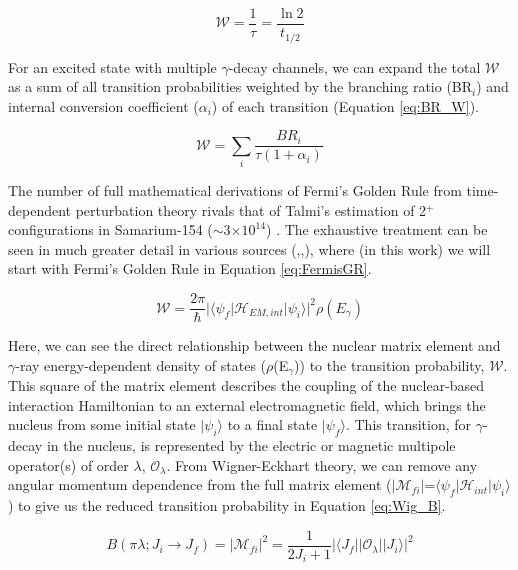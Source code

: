 \begin{equation}\label{eq:life_halflife}
\mathcal{W}=\frac{1}{\tau}=\frac{\ln2}{t_{1/2}}
\end{equation}

For an excited state with multiple $\gamma$-decay channels, we can expand the total $\mathcal{W}$ as a sum of all transition probabilities weighted by the branching ratio (BR$_i$) and internal conversion coefficient ($\alpha_i$) of each transition (Equation \ref{eq:BR_W}).

\begin{equation}\label{eq:BR_W}
\mathcal{W}=\sum_i\frac{BR_i}{\tau(1+\alpha_i)}
\end{equation}

The number of full mathematical derivations of Fermi's Golden Rule from time-dependent perturbation theory rivals that of Talmi's estimation of 2$^+$ configurations in Samarium-154 ($\sim$3$\times10^{14}$) \cite{Casten_text}. The exhaustive treatment can be seen in much greater detail in various sources (\cite{Wong_text},\cite{Heyde_text},\cite{BlattWeiss_text}), where (in this work) we will start with Fermi's Golden Rule \cite{Wong_text} in Equation \ref{eq:FermisGR}.

\begin{equation}\label{eq:FermisGR}
\mathcal{W}=\frac{2\pi}{\hbar}\vert\langle\psi_f\vert \mathcal{H}_{EM,int}\vert\psi_i\rangle\vert^2\rho(E_\gamma)
\end{equation}

Here, we can see the direct relationship between the nuclear matrix element and $\gamma$-ray energy-dependent density of states ($\rho$(E$_\gamma$)) to the transition probability, $\mathcal{W}$. This square of the matrix element describes the coupling of the nuclear-based interaction Hamiltonian to an external electromagnetic field, which brings the nucleus from some initial state $\vert\psi_i\rangle$ to a final state $\vert\psi_f\rangle$. This transition, for $\gamma$-decay in the nucleus, is represented by the electric or magnetic multipole operator(s) of order $\lambda$, $\mathcal{O}_{\lambda}$. From Wigner-Eckhart theory, we can remove any angular momentum dependence from the full matrix element ($\vert\mathcal{M}_{fi}\vert$=$\langle\psi_f\vert \mathcal{H}_{int}\vert\psi_i\rangle$) to give us the reduced transition probability in Equation \ref{eq:Wig_B}.

\begin{equation}\label{eq:Wig_B}
  B(\pi\lambda;J_i\rightarrow J_f)=\vert \mathcal{M}_{fi}\vert^2=\frac{1}{2J_i+1}\vert\langle J_f\vert\vert \mathcal{O}_{\lambda}\vert\vert J_i\rangle\vert^2
\end{equation}

